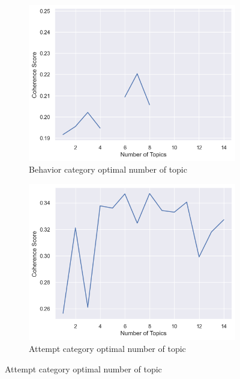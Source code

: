 \documentclass[sn-mathphys,Numbered]{sn-jnl}%
\theoremstyle{thmstyleone}%
\theoremstyle{thmstyletwo}%
\theoremstyle{thmstylethree}%
\begin{document}
\begin{figure}[h!]
\begin{subfigure}{0.45\textwidth}
    \includegraphics[width=\textwidth]{cv_behavior.png}
    \caption{Behavior category optimal number of topic}
    \label{Redditdist}
\end{subfigure}
\hfill
\begin{subfigure}{0.45\textwidth}
    \includegraphics[width=\textwidth]{cv_attempt.png}
    \caption{Attempt category optimal number of topic}
    \label{Twitterdist}
\end{subfigure}   
\label{Redditdist_Twitterdist}
\end{figure}
\end{document}
